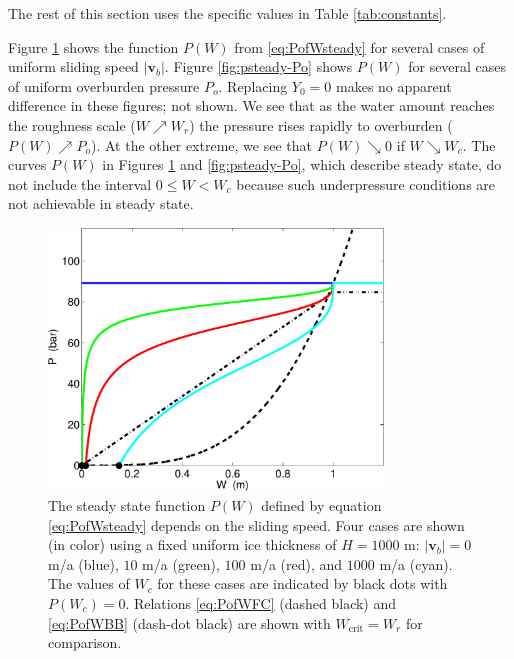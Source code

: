 \documentclass[11pt,final]{amsart}%
\newcommand\bv{\mathbf{v}}
\begin{document}
The rest of this section uses the specific values in Table \ref{tab:constants}.

\newcommand{\upto}{ \!\!\nearrow\! }
\newcommand{\downto}{ \!\searrow\! }
Figure \ref{fig:psteady-vb} shows the function $P(W)$ from \eqref{eq:PofWsteady} for several cases of uniform sliding speed $|\bv_b|$.  Figure \ref{fig:psteady-Po} shows $P(W)$ for several cases of uniform overburden pressure $P_o$.  Replacing $Y_0=0$ makes no apparent difference in these figures; not shown.  We see that as the water amount reaches the roughness scale ($W\upto W_r$) the pressure rises rapidly to overburden ($P(W) \upto P_o$).  At the other extreme, we see that $P(W) \downto 0$ if $W \downto W_c$.  The curves $P(W)$ in Figures \ref{fig:psteady-vb} and \ref{fig:psteady-Po}, which describe steady state, do not include the interval $0\le W < W_c$ because such underpressure conditions are not achievable in steady state.

\begin{figure}[ht]
\includegraphics[width=3.5in,keepaspectratio=true]{figs/psteady-vb}
\medskip
\caption{The steady state function $P(W)$ defined by equation \eqref{eq:PofWsteady} depends on the sliding speed.  Four cases are shown (in color) using a fixed uniform ice thickness of $H=1000$ m: $|\bv_b|=0$ m/a (blue), $10$ m/a (green), $100$ m/a (red), and $1000$ m/a (cyan).  The values of $W_c$ for these cases are indicated by black dots with $P(W_c)=0$.  Relations \eqref{eq:PofWFC} (dashed black) and \eqref{eq:PofWBB} (dash-dot black) are shown with $W_{\text{crit}}=W_r$ for comparison.}
\label{fig:psteady-vb}
\end{figure}
\end{document}
